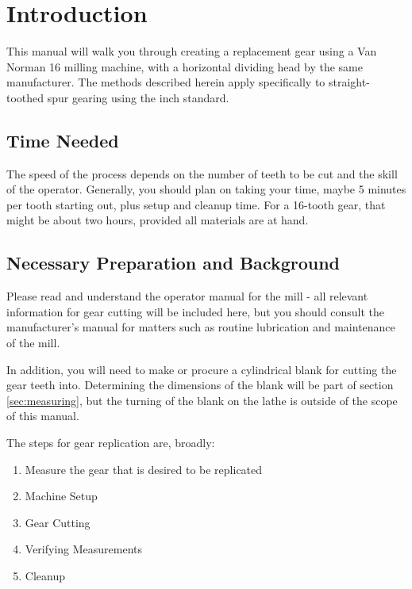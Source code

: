 \documentclass[12pt,twoside,letterpaper]{article}
\begin{document}
\clearpage

\tableofcontents

\section{Introduction}

This manual will walk you through creating a replacement gear using a Van Norman 16 milling machine, with a horizontal dividing head by the same manufacturer. The methods described herein apply specifically to straight-toothed spur gearing using the inch standard. 

\subsection{ Time Needed}

The speed of the process depends on the number of teeth to be cut and the skill of the operator. Generally, you should plan on taking your time, maybe 5 minutes per tooth starting out, plus setup and cleanup time. For a 16-tooth gear, that might be about two hours, provided all materials are at hand.


\subsection{Necessary Preparation and Background}
Please read and understand the operator manual for the mill - all relevant information for gear cutting will be included here, but you should consult the manufacturer's manual for matters such as routine lubrication and maintenance of the mill.

In addition, you will need to make or procure a cylindrical blank for cutting the gear teeth into. Determining the dimensions of the blank will be part of section \ref{sec:measuring}, but the turning of the blank on the lathe is outside of the scope of this manual.


The steps for gear replication are, broadly:

\begin{enumerate}
\item Measure the gear that is desired to be replicated
\item Machine Setup
\item Gear Cutting
\item Verifying Measurements
\item Cleanup
\end{enumerate}
\end{document}
